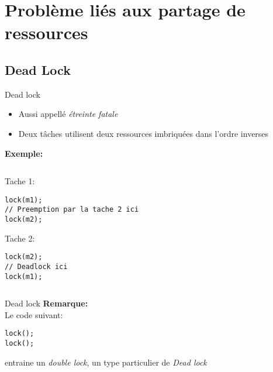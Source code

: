 \section{Problème liés aux partage de ressources}

\subsection{Dead Lock}

\begin{frame}[fragile]{Dead lock}
  \begin{itemize} 
  \item Aussi appellé \emph{étreinte fatale}
  \item Deux tâches utilisent  deux ressources imbriquées dans l'ordre
    inverses
  \end{itemize} 
  \textbf{Exemple:}
  \begin{columns}
    \begin{column}{6.5cm}
      Tache 1:
      \begin{lstlisting}
lock(m1);
// Preemption par la tache 2 ici
lock(m2);
      \end{lstlisting} 

      Tache 2:
      \begin{lstlisting} 
lock(m2);
// Deadlock ici
lock(m1);
      \end{lstlisting} 
    \end{column}
    \begin{column}{4cm}
    \end{column}
  \end{columns}
\end{frame} 

\begin{frame}[fragile]{Dead lock}
  \textbf{Remarque:} \\
  Le code suivant:
  \begin{lstlisting} 
lock();
lock(); 
  \end{lstlisting} 
  entraine un  \emph{double lock},  un type particulier  de \emph{Dead
    lock}
\end{frame} 

